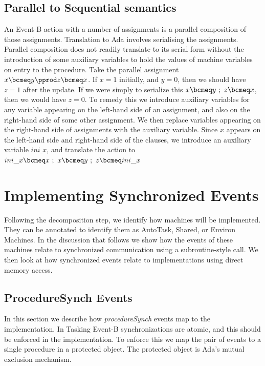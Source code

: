\subsection{Parallel to Sequential semantics}
An Event-B action with a number of assignments is a parallel composition of those assignments. Translation to Ada involves serialising the assignments. Parallel composition does not readily translate to its serial form without the introduction of some auxiliary variables to hold the values of machine variables on entry to the procedure. Take the parallel assignment $x\bcmeq y \pprod z\bcmeq x$.  If $x=1$ initially, and $y=0$, then we should have $z=1$ after the update. If we were simply to serialize this $x\bcmeq y~ ;~ z\bcmeq x$, then we would have $z=0$.  To remedy this we introduce auxiliary variables for any variable appearing on the left-hand side of an assignment, and also on the right-hand side of some other assignment. We then replace variables appearing on the right-hand side of assignments with the auxiliary variable. Since $x$ appears on the left-hand side and right-hand side of the clauses, we introduce an auxiliary variable $ini\_x$, and translate the action to $ini\_x\bcmeq x~;~ x\bcmeq y~ ;~ z\bcmeq ini\_x$
%
\section{Implementing Synchronized Events}\label{formalSynch}
Following the decomposition step, we identify how machines will be implemented. They can be annotated to identify them as AutoTask, Shared, or Environ Machines. In the discussion that follows we show how the events of these machines relate to synchronized communication using a subroutine-style call. We then look at how synchronized events relate to implementations using direct memory access.
%
\subsection{ProcedureSynch Events}\label{formalProc}
In this section we describe how \emph{procedureSynch} events map to the implementation. In Tasking Event-B synchronizations are atomic, and this should be enforced in the implementation. To enforce this we map the pair of events to a single procedure in a protected object. The protected object is Ada's mutual exclusion mechanism.

